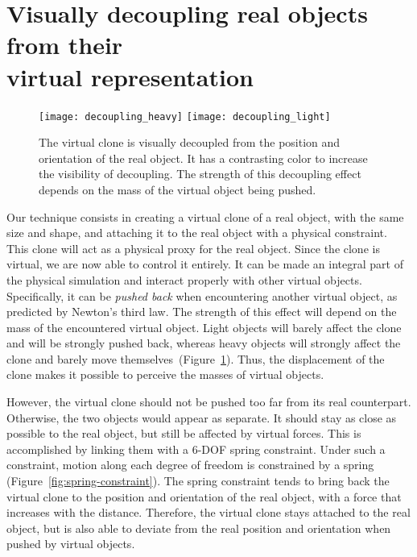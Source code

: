 \documentclass{vgtc}
\begin{document}
\section{Visually decoupling real objects from their\\ virtual representation}
\label{sec:decoupling}

\begin{figure}[h]
  \centering
  \vspace{-1.5mm}
  \texttt{[image: decoupling\_heavy]}
  \hspace{1mm}
  \texttt{[image: decoupling\_light]}
  \vspace{-1.25mm}
  \caption{The virtual clone is visually decoupled from the position and orientation of the real object. It has a contrasting color to increase the visibility of decoupling. The strength of this decoupling effect depends on the mass of the virtual object being pushed. }
  \label{fig:decoupling}
  \vspace{-1.75mm}
\end{figure}

Our technique consists in creating a virtual clone of a real object, with the same size and shape, and attaching it to the real object with a physical constraint. This clone will act as a physical proxy for the real object. Since the clone is virtual, we are now able to control it entirely. It can be made an integral part of the physical simulation and interact properly with other virtual objects. Specifically, it can be \emph{pushed back} when encountering another virtual object, as predicted by Newton's third law. The strength of this effect will depend on the mass of the encountered virtual object. Light objects will barely affect the clone and will be strongly pushed back, whereas heavy objects will strongly affect the clone and barely move themselves~(Figure~\ref{fig:decoupling}). Thus, the displacement of the clone makes it possible to perceive the masses of virtual objects.

However, the virtual clone should not be pushed too far from its real counterpart. Otherwise, the two objects would appear as separate. It should stay as close as possible to the real object, but still be affected by virtual forces. This is accomplished by linking them with a 6-DOF spring constraint. Under such a constraint, motion along each degree of freedom is constrained by a spring (Figure~\ref{fig:spring-constraint}). The spring constraint tends to bring back the virtual clone to the position and orientation of the real object, with a force that increases with the distance. Therefore, the virtual clone stays attached to the real object, but is also able to deviate from the real position and orientation when pushed by virtual objects.
\end{document}
